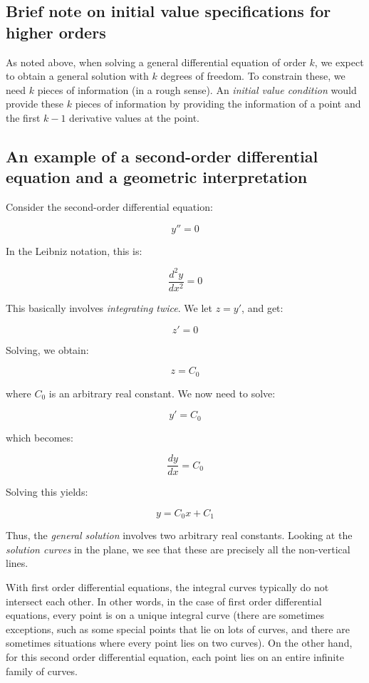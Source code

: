 \documentclass{amsart}
\begin{document}
\subsection{Brief note on initial value specifications for higher orders}

As noted above, when solving a general differential equation of order
$k$, we expect to obtain a general solution with $k$ degrees of
freedom. To constrain these, we need $k$ pieces of information (in a
rough sense). An {\em initial value condition} would provide these $k$
pieces of information by providing the information of a point and the
first $k - 1$ derivative values at the point.

\subsection{An example of a second-order differential equation and a geometric interpretation}

Consider the second-order differential equation:

$$y'' = 0$$

In the Leibniz notation, this is:

$$\frac{d^2y}{dx^2} = 0$$

This basically involves {\em integrating twice}. We let $z = y'$, and get:

$$z' = 0$$

Solving, we obtain:

$$z = C_0$$

where $C_0$ is an arbitrary real constant. We now need to solve:

$$y' = C_0$$

which becomes:

$$\frac{dy}{dx} = C_0$$

Solving this yields:

$$y = C_0x + C_1$$

Thus, the {\em general solution} involves two arbitrary real
constants. Looking at the {\em solution curves} in the plane, we see
that these are precisely all the non-vertical lines.

With first order differential equations, the integral curves typically
do not intersect each other. In other words, in the case of first
order differential equations, every point is on a unique integral
curve (there are sometimes exceptions, such as some special points
that lie on lots of curves, and there are sometimes situations where
every point lies on two curves). On the other hand, for this second
order differential equation, each point lies on an entire infinite
family of curves.
\end{document}
